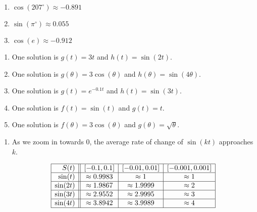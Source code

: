 \documentclass{ximera}
\begin{document}
\begin{multicols}{3}

\begin{enumerate}

\setcounter{enumi}{\value{HW}}

\item $\cos(207^{\circ}) \approx -0.891$
\item $\sin\left( \pi^{\circ} \right) \approx 0.055$
\item $\cos(e) \approx -0.912$

\setcounter{HW}{\value{enumi}}

\end{enumerate}
\end{multicols}

\begin{enumerate}
\setcounter{enumi}{\value{HW}}

\item One solution is $g(t) = 3t$ and $h(t) = \sin(2t)$.
\item One solution is $g(\theta) = 3 \cos(\theta)$ and $h(\theta) = \sin(4 \theta)$.
\item One solution is $g(t) =  e^{-0.1t}$ and $h(t) = \sin(3t)$. 
\item One solution is $f(t) = \sin(t)$ and $g(t) = t$.
\item One solution is $f(\theta) = 3 \cos(\theta)$ and $g(\theta) = \sqrt{\theta}$.

\setcounter{HW}{\value{enumi}}
\end{enumerate}

\begin{enumerate}
\setcounter{enumi}{\value{HW}}

\item  As we zoom in towards $0$, the average rate of change of $\sin(k t)$ approaches $k$.

\[ \begin{array}{|r||c|c|c|}  \hline

 S(t) &  [-0.1, 0.1] & [-0.01, 0.01] &[-0.001, 0.001] \\ \hline
 \sin(t)     & \approx 0.9983  &  \approx 1  &  \approx 1 \\  \hline
 \sin(2t)   & \approx 1.9867 & \approx  1.9999 & \approx 2 \\ \hline
 \sin(3t)   & \approx 2.9552 & \approx 2.9995 &  \approx 3  \\  \hline
 \sin(4t)  & \approx 3.8942 & \approx 3.9989 &  \approx 4 \\  \hline

\end{array} \]

\setcounter{HW}{\value{enumi}}
\end{enumerate}
\end{document}
